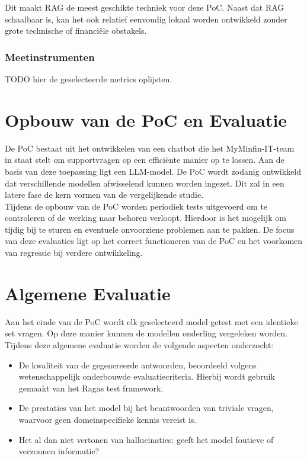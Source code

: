 Dit maakt RAG de meest geschikte techniek voor deze PoC. Naast dat RAG schaalbaar is, kan het ook relatief eenvoudig lokaal worden ontwikkeld zonder grote technische of financiële obstakels.

\subsubsection{Meetinstrumenten}

TODO hier de geselecteerde metrics oplijsten.

\section{Opbouw van de PoC en Evaluatie}

De PoC bestaat uit het ontwikkelen van een chatbot die het MyMinfin-IT-team in staat stelt om supportvragen op een efficiënte manier op te lossen. Aan de basis van deze toepassing ligt een LLM-model. De PoC wordt zodanig ontwikkeld dat verschillende modellen afwisselend kunnen worden ingezet. Dit zal in een latere fase de kern vormen van de vergelijkende studie.
\\[1em]
Tijdens de opbouw van de PoC worden periodiek tests uitgevoerd om te controleren of de werking naar behoren verloopt. Hierdoor is het mogelijk om tijdig bij te sturen en eventuele onvoorziene problemen aan te pakken. De focus van deze evaluaties ligt op het correct functioneren van de PoC en het voorkomen van regressie bij verdere ontwikkeling.

\section{Algemene Evaluatie}

Aan het einde van de PoC wordt elk geselecteerd model getest met een identieke set vragen. Op deze manier kunnen de modellen onderling vergeleken worden. Tijdens deze algemene evaluatie worden de volgende aspecten onderzocht:

\begin{itemize}
    \item De kwaliteit van de gegenereerde antwoorden, beoordeeld volgens wetenschappelijk onderbouwde evaluatiecriteria. Hierbij wordt gebruik gemaakt van het Ragas test framework.
    \item De prestaties van het model bij het beantwoorden van triviale vragen, waarvoor geen domeinspecifieke kennis vereist is.
    \item Het al dan niet vertonen van hallucinaties: geeft het model foutieve of verzonnen informatie?
\end{itemize}

